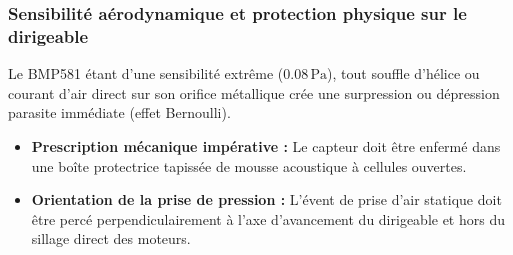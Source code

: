 \documentclass[../Materiel.tex]{subfiles}
\begin{document}
\subsubsection{Sensibilité aérodynamique et protection physique sur le dirigeable}
Le BMP581 étant d'une sensibilité extrême ($0.08\,\text{Pa}$), tout souffle d'hélice ou courant d'air direct sur son orifice métallique crée une surpression ou dépression parasite immédiate (effet Bernoulli).
\begin{itemize}
    \item \textbf{Prescription mécanique impérative :} Le capteur doit être enfermé dans une boîte protectrice tapissée de mousse acoustique à cellules ouvertes.
    \item \textbf{Orientation de la prise de pression :} L'évent de prise d'air statique doit être percé perpendiculairement à l'axe d'avancement du dirigeable et hors du sillage direct des moteurs.
\end{itemize}
\end{document}
